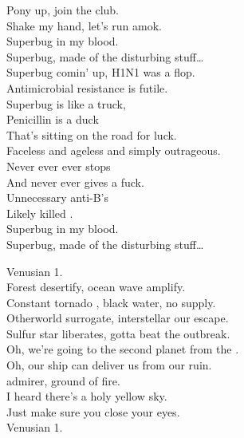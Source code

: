Pony up, join the club. \\
Shake my hand, let's run amok. \\

Superbug in my blood. \\
Superbug, made of the disturbing stuff… \\

Superbug comin' up, H1N1 was a flop. \\
Antimicrobial resistance is futile. \\
Superbug is like a truck, \\
Penicillin is a duck \\
That's sitting on the road for luck. \\

Faceless and ageless and simply outrageous. \\
Never ever ever stops \\
And never ever gives a fuck. \\

Unnecessary anti-B's \\
Likely killed . \\

Superbug in my blood. \\
Superbug, made of the disturbing stuff… \\





Venusian 1. \\

Forest desertify, ocean wave amplify. \\
Constant tornado , black water, no supply. \\
Otherworld surrogate, interstellar our escape. \\
Sulfur star liberates, gotta beat the outbreak. \\

Oh, we're going to the second planet from the . \\
Oh, our ship can deliver us from our ruin. \\

 admirer, ground of fire. \\
I heard there's a holy yellow sky. \\
Just make sure you close your eyes. \\
Venusian 1. \\

